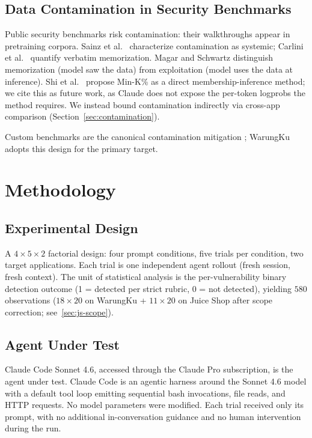 \documentclass[conference]{IEEEtran}
\begin{document}
\subsection{Data Contamination in Security Benchmarks}

Public security benchmarks risk contamination: their walkthroughs appear in pretraining corpora. Sainz et al.\ \cite{sainz2023nlp} characterize contamination as systemic; Carlini et al.\ \cite{carlini2023memorize} quantify verbatim memorization. Magar and Schwartz \cite{magar2022contamination} distinguish memorization (model saw the data) from exploitation (model uses the data at inference). Shi et al.\ \cite{shi2024detect} propose Min-K\% as a direct membership-inference method; we cite this as future work, as Claude does not expose the per-token logprobs the method requires. We instead bound contamination indirectly via cross-app comparison (Section~\ref{sec:contamination}).

Custom benchmarks are the canonical contamination mitigation \cite{shao2024nyuctf, zhang2024cybench}; WarungKu adopts this design for the primary target.

\section{Methodology}
\label{sec:methodology}

\subsection{Experimental Design}

A $4 \times 5 \times 2$ factorial design: four prompt conditions, five trials per condition, two target applications. Each trial is one independent agent rollout (fresh session, fresh context). The unit of statistical analysis is the per-vulnerability binary detection outcome (1 = detected per strict rubric, 0 = not detected), yielding $580$ observations ($18 \times 20$ on WarungKu + $11 \times 20$ on Juice Shop after scope correction; see~\ref{sec:js-scope}).

\subsection{Agent Under Test}

Claude Code Sonnet 4.6, accessed through the Claude Pro subscription, is the agent under test. Claude Code is an agentic harness around the Sonnet 4.6 model with a default tool loop emitting sequential bash invocations, file reads, and HTTP requests. No model parameters were modified. Each trial received only its prompt, with no additional in-conversation guidance and no human intervention during the run.
\end{document}
